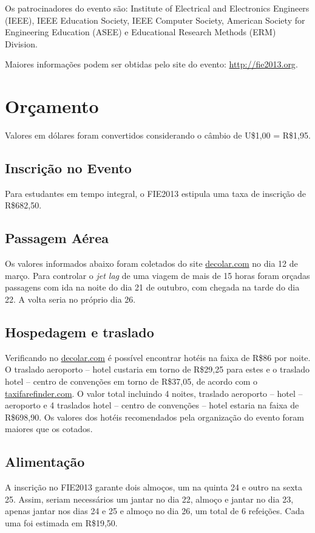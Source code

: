 \documentclass[brazil]{article}
\begin{document}
Os patrocinadores do evento são: Institute of Electrical and Electronics Engineers (IEEE), IEEE Education Society, IEEE Computer Society, American Society for Engineering Education (ASEE) e Educational Research Methods (ERM) Division.

Maiores informações podem ser obtidas pelo site do evento: \url{http://fie2013.org}.

\section{Orçamento}
Valores em dólares foram convertidos considerando o câmbio de U\$1,00 = R\$1,95.

\subsection{Inscrição no Evento}
Para estudantes em tempo integral, o FIE2013 estipula uma taxa de inscrição de R\$682,50.

\subsection{Passagem Aérea}
Os valores informados abaixo foram coletados do site \url{decolar.com} no dia 12 de março. Para controlar o \emph{jet lag} de uma viagem de mais de 15 horas foram orçadas passagens com ida na noite do dia 21 de outubro, com chegada na tarde do dia 22. A volta seria no próprio dia 26.

\subsection{Hospedagem e traslado}
Verificando no \url{decolar.com} é possível encontrar hotéis na faixa de R\$86 por noite. O traslado aeroporto -- hotel custaria em torno de R\$29,25 para estes e o traslado hotel -- centro de convenções em torno de R\$37,05, de acordo com o \url{taxifarefinder.com}. O valor total incluindo 4 noites, traslado aeroporto -- hotel -- aeroporto e 4 traslados hotel -- centro de convenções -- hotel estaria na faixa de R\$698,90. Os valores dos hotéis recomendados pela organização do evento foram maiores que os cotados.

\subsection{Alimentação}
A inscrição no FIE2013 garante dois almoços, um na quinta 24 e outro na sexta 25. Assim, seriam necessários um jantar no dia 22, almoço e jantar no dia 23, apenas jantar nos dias 24 e 25 e almoço no dia 26, um total de 6 refeições. Cada uma foi estimada em R\$19,50.
\end{document}
